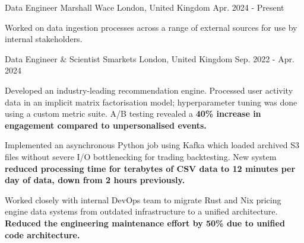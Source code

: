

\begin{cventries}

  \cventry
    {Data Engineer} %
    {Marshall Wace} %
    {London, United Kingdom} %
    {Apr. 2024 - Present} %
    {
      \begin{cvitems} %
        \item {Worked on data ingestion processes across a range of external sources for use by internal stakeholders.}
      \end{cvitems}
    }

  \cventry
    {Data Engineer \& Scientist} %
    {Smarkets} %
    {London, United Kingdom} %
    {Sep. 2022 - Apr. 2024} %
    {
      \begin{cvitems} %
        \item {Developed an industry-leading recommendation engine. Processed user activity data in an implicit matrix factorisation model; hyperparameter tuning was done using a custom metric suite. A/B testing revealed a \bf{40\% increase in engagement} compared to unpersonalised events.}
        \item {Implemented an asynchronous Python job using Kafka which loaded archived S3 files without severe I/O bottlenecking for trading backtesting. New system \bf{reduced processing time for terabytes of CSV data to 12 minutes} per day of data, down from 2 hours previously.}
        \item {Worked closely with internal DevOps team to migrate Rust and Nix pricing engine data systems from outdated infrastructure to a unified architecture. \bf{Reduced the engineering maintenance effort by 50\%} due to unified code architecture.}
      \end{cvitems}
    }


\end{cventries}
